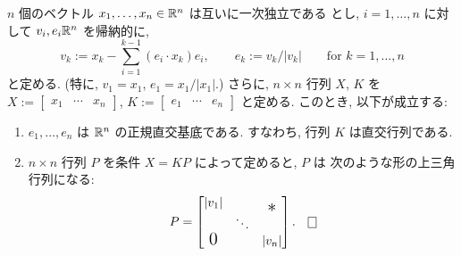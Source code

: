\documentclass[12pt,twoside]{jarticle}
\begin{document}
\begin{question}\label{q:Schmidt}
  $n$ 個のベクトル $x_1, \dots, x_n \in {\mathbb R}^n$ は互いに一次独立である
  とし, $i = 1, \dots, n$ に対して $v_i, e_i {\mathbb R}^n$ を帰納的に,
  \[
    v_k := x_k - \sum_{i=1}^{k-1} (e_i \cdot x_k) e_i,
    \qquad
    e_k := v_k / |v_k|
    \qquad \text{for $k=1,\ldots,n$}
  \]
  と定める. (特に, $v_1 = x_1$, $e_1 = x_1 / |x_1|$.) %
  さらに, $n \times n$ 行列 $X$, $K$ を %
  $X := \begin{bmatrix} x_1 & \cdots & x_n \end{bmatrix}$, %
  $K := \begin{bmatrix} e_1 & \cdots & e_n \end{bmatrix}$ %
  と定める. このとき, 以下が成立する:
  \begin{enumerate}
  \item $e_1, \dots, e_n$ は ${\mathbb R}^n$ の正規直交基底である. %
    すなわち, 行列 $K$ は直交行列である.
  \item $n \times n$ 行列 $P$ を条件 $X = KP$ によって定めると, $P$ は
    次のような形の上三角行列になる:
    \[
      P =
      \begin{bmatrix}
        |v_1|         &        & \smash{\lower 1ex \hbox{\Large $\ast$}} \\
                      & \ddots & \\
        \smash{\hbox{\Large $0$}} & & |v_n| \\
      \end{bmatrix}.
      \qed
    \]
  \end{enumerate}
\end{question}
\end{document}
